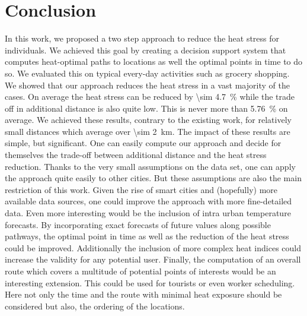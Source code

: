 
\section{Conclusion}

In this work, we proposed a two step approach to reduce the heat stress for individuals. We achieved this goal by creating a decision support system that computes heat-optimal paths to locations as well the optimal points in time to do so. We evaluated this on typical every-day activities such as grocery shopping. 
We showed that our approach reduces the heat stress in a vast majority of the cases. On average the heat stress can be reduced by \SI{\sim 4.7}{\percent} while the trade off in additional distance is also quite low. This is never more than \SI{5.76}{\percent} on average. We achieved these results, contrary to the existing work, for relatively small distances which average over \SI{\sim  2}{\kilo\meter}.
The impact of these results are simple, but significant. One can easily compute our approach and decide for themselves the trade-off between additional distance and the heat stress reduction.
Thanks to the very small assumptions on the data set, one can apply the approach quite easily to other cities. 
But these assumptions are also the main restriction of this work. Given the rise of smart cities and (hopefully) more available data sources, one could improve the approach with more fine-detailed data. Even more interesting would be the inclusion of intra urban temperature forecasts. By incorporating exact forecasts of future values along possible pathways, the optimal point in time as well as the reduction of the heat stress could be improved. Additionally the inclusion of more complex heat indices could increase the validity for any potential user. 
Finally, the computation of an overall route which covers a multitude of potential points of interests would be an interesting extension. This could be used for tourists or even worker scheduling. Here not only the time and the route with minimal heat exposure should be considered but also, the ordering of the locations.  